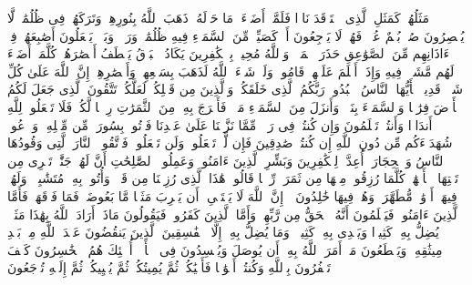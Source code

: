 \startbuffer[\q:2:17]
مَثَلُهُمۡ كَمَثَلِ ٱلَّذِی ٱسۡتَوۡقَدَ نَارࣰا فَلَمَّاۤ أَضَاۤءَتۡ مَا حَوۡلَهُۥ ذَهَبَ ٱللَّهُ بِنُورِهِمۡ وَتَرَكَهُمۡ فِی ظُلُمَٰتࣲ لَّا یُبۡصِرُونَ%
\stopbuffer
\startbuffer[\q:2:18]
صُمُّۢ بُكۡمٌ عُمۡیࣱ فَهُمۡ لَا یَرۡجِعُونَ%
\stopbuffer
\startbuffer[\q:2:19]
أَوۡ كَصَیِّبࣲ مِّنَ ٱلسَّمَاۤءِ فِیهِ ظُلُمَٰتࣱ وَرَعۡدࣱ وَبَرۡقࣱ یَجۡعَلُونَ أَصَٰبِعَهُمۡ فِیۤ ءَاذَانِهِم مِّنَ ٱلصَّوَٰعِقِ حَذَرَ ٱلۡمَوۡتِۚ وَٱللَّهُ مُحِیطُۢ بِٱلۡكَٰفِرِینَ%
\stopbuffer
\startbuffer[\q:2:20]
یَكَادُ ٱلۡبَرۡقُ یَخۡطَفُ أَبۡصَٰرَهُمۡۖ كُلَّمَاۤ أَضَاۤءَ لَهُم مَّشَوۡا۟ فِیهِ وَإِذَاۤ أَظۡلَمَ عَلَیۡهِمۡ قَامُوا۟ۚ وَلَوۡ شَاۤءَ ٱللَّهُ لَذَهَبَ بِسَمۡعِهِمۡ وَأَبۡصَٰرِهِمۡۚ إِنَّ ٱللَّهَ عَلَىٰ كُلِّ شَیۡءࣲ قَدِیرࣱ%
\stopbuffer
\startbuffer[\q:2:21]
یَٰۤأَیُّهَا ٱلنَّاسُ ٱعۡبُدُوا۟ رَبَّكُمُ ٱلَّذِی خَلَقَكُمۡ وَٱلَّذِینَ مِن قَبۡلِكُمۡ لَعَلَّكُمۡ تَتَّقُونَ%
\stopbuffer
\startbuffer[\q:2:22]
ٱلَّذِی جَعَلَ لَكُمُ ٱلۡأَرۡضَ فِرَٰشࣰا وَٱلسَّمَاۤءَ بِنَاۤءࣰ وَأَنزَلَ مِنَ ٱلسَّمَاۤءِ مَاۤءࣰ فَأَخۡرَجَ بِهِۦ مِنَ ٱلثَّمَرَٰتِ رِزۡقࣰا لَّكُمۡۖ فَلَا تَجۡعَلُوا۟ لِلَّهِ أَندَادࣰا وَأَنتُمۡ تَعۡلَمُونَ%
\stopbuffer
\startbuffer[\q:2:23]
وَإِن كُنتُمۡ فِی رَیۡبࣲ مِّمَّا نَزَّلۡنَا عَلَىٰ عَبۡدِنَا فَأۡتُوا۟ بِسُورَةࣲ مِّن مِّثۡلِهِۦ وَٱدۡعُوا۟ شُهَدَاۤءَكُم مِّن دُونِ ٱللَّهِ إِن كُنتُمۡ صَٰدِقِینَ%
\stopbuffer
\startbuffer[\q:2:24]
فَإِن لَّمۡ تَفۡعَلُوا۟ وَلَن تَفۡعَلُوا۟ فَٱتَّقُوا۟ ٱلنَّارَ ٱلَّتِی وَقُودُهَا ٱلنَّاسُ وَٱلۡحِجَارَةُۖ أُعِدَّتۡ لِلۡكَٰفِرِینَ%
\stopbuffer
\startbuffer[\q:2:25]
وَبَشِّرِ ٱلَّذِینَ ءَامَنُوا۟ وَعَمِلُوا۟ ٱلصَّٰلِحَٰتِ أَنَّ لَهُمۡ جَنَّٰتࣲ تَجۡرِی مِن تَحۡتِهَا ٱلۡأَنۡهَٰرُۖ كُلَّمَا رُزِقُوا۟ مِنۡهَا مِن ثَمَرَةࣲ رِّزۡقࣰا قَالُوا۟ هَٰذَا ٱلَّذِی رُزِقۡنَا مِن قَبۡلُۖ وَأُتُوا۟ بِهِۦ مُتَشَٰبِهࣰاۖ وَلَهُمۡ فِیهَاۤ أَزۡوَٰجࣱ مُّطَهَّرَةࣱۖ وَهُمۡ فِیهَا خَٰلِدُونَ%
\stopbuffer
\startbuffer[\q:2:26]
۞ إِنَّ ٱللَّهَ لَا یَسۡتَحۡیِۦۤ أَن یَضۡرِبَ مَثَلࣰا مَّا بَعُوضَةࣰ فَمَا فَوۡقَهَاۚ فَأَمَّا ٱلَّذِینَ ءَامَنُوا۟ فَیَعۡلَمُونَ أَنَّهُ ٱلۡحَقُّ مِن رَّبِّهِمۡۖ وَأَمَّا ٱلَّذِینَ كَفَرُوا۟ فَیَقُولُونَ مَاذَاۤ أَرَادَ ٱللَّهُ بِهَٰذَا مَثَلࣰاۘ یُضِلُّ بِهِۦ كَثِیرࣰا وَیَهۡدِی بِهِۦ كَثِیرࣰاۚ وَمَا یُضِلُّ بِهِۦۤ إِلَّا ٱلۡفَٰسِقِینَ%
\stopbuffer
\startbuffer[\q:2:27]
ٱلَّذِینَ یَنقُضُونَ عَهۡدَ ٱللَّهِ مِنۢ بَعۡدِ مِیثَٰقِهِۦ وَیَقۡطَعُونَ مَاۤ أَمَرَ ٱللَّهُ بِهِۦۤ أَن یُوصَلَ وَیُفۡسِدُونَ فِی ٱلۡأَرۡضِۚ أُو۟لَٰۤئِكَ هُمُ ٱلۡخَٰسِرُونَ%
\stopbuffer
\startbuffer[\q:2:28]
كَیۡفَ تَكۡفُرُونَ بِٱللَّهِ وَكُنتُمۡ أَمۡوَٰتࣰا فَأَحۡیَٰكُمۡۖ ثُمَّ یُمِیتُكُمۡ ثُمَّ یُحۡیِیكُمۡ ثُمَّ إِلَیۡهِ تُرۡجَعُونَ%
\stopbuffer
\startbuffer[\q:2:29]
